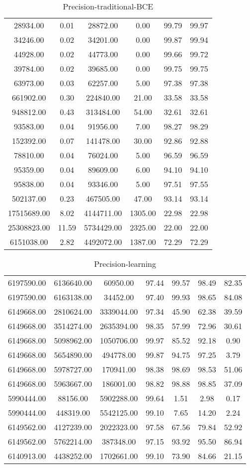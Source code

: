 \begin{table}
\caption{Precision-traditional-BCE}
\begin{tabular}{cccccc}
28934.00& 0.01& 28872.00& 0.00& 99.79& 99.97\tabularnewline
34246.00& 0.02& 34201.00& 0.00& 99.87& 99.94\tabularnewline
44928.00& 0.02& 44773.00& 0.00& 99.66& 99.72\tabularnewline
39784.00& 0.02& 39685.00& 0.00& 99.75& 99.75\tabularnewline
63973.00& 0.03& 62257.00& 5.00& 97.38& 97.38\tabularnewline
661902.00& 0.30& 224840.00& 21.00& 33.58& 33.58\tabularnewline
948812.00& 0.43& 313484.00& 54.00& 32.61& 32.61\tabularnewline
93583.00& 0.04& 91956.00& 7.00& 98.27& 98.29\tabularnewline
152392.00& 0.07& 141478.00& 30.00& 92.86& 92.88\tabularnewline
78810.00& 0.04& 76024.00& 5.00& 96.59& 96.59\tabularnewline
95359.00& 0.04& 89609.00& 6.00& 94.10& 94.10\tabularnewline
95838.00& 0.04& 93346.00& 5.00& 97.51& 97.55\tabularnewline
502137.00& 0.23& 467505.00& 47.00& 93.14& 93.14\tabularnewline
17515689.00& 8.02& 4144711.00& 1305.00& 22.98& 22.98\tabularnewline
25308823.00& 11.59& 5734429.00& 2325.00& 22.00& 22.00\tabularnewline
6151038.00& 2.82& 4492072.00& 1387.00& 72.29& 72.29\tabularnewline
\end{tabular}
\end{table}
\begin{table}
\caption{Precision-learning}
\begin{tabular}{ccccccc}
6197590.00& 6136640.00& 60950.00& 97.44& 99.57& 98.49& 82.35\tabularnewline
6197590.00& 6163138.00& 34452.00& 97.40& 99.93& 98.65& 84.08\tabularnewline
6149668.00& 2810624.00& 3339044.00& 97.34& 45.90& 62.38& 39.59\tabularnewline
6149668.00& 3514274.00& 2635394.00& 98.35& 57.99& 72.96& 30.61\tabularnewline
6149668.00& 5098962.00& 1050706.00& 99.97& 85.52& 92.18& 0.90\tabularnewline
6149668.00& 5654890.00& 494778.00& 99.87& 94.75& 97.25& 3.79\tabularnewline
6149668.00& 5978727.00& 170941.00& 98.38& 98.69& 98.53& 51.06\tabularnewline
6149668.00& 5963667.00& 186001.00& 98.82& 98.88& 98.85& 37.09\tabularnewline
5990444.00& 88156.00& 5902288.00& 99.64& 1.51& 2.98& 0.17\tabularnewline
5990444.00& 448319.00& 5542125.00& 99.10& 7.65& 14.20& 2.24\tabularnewline
6149562.00& 4127239.00& 2022323.00& 97.58& 67.56& 79.84& 52.92\tabularnewline
6149562.00& 5762214.00& 387348.00& 97.15& 93.92& 95.50& 86.94\tabularnewline
6140913.00& 4438252.00& 1702661.00& 99.10& 73.90& 84.66& 21.15\tabularnewline
\end{tabular}
\end{table}
